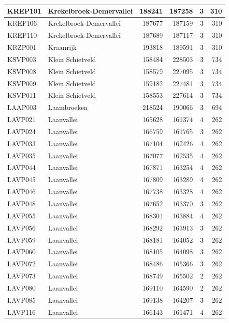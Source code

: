 \documentclass[11pt,]{book}
\begin{document}
\begin{table}
\begin{tabular}[t]{l|l|r|r|r|r}
\hline
KREP101 & Krekelbroek-Demervallei & 188241 & 187258 & 3 & 310\\
\hline
KREP106 & Krekelbroek-Demervallei & 187677 & 187159 & 3 & 310\\
\hline
KREP110 & Krekelbroek-Demervallei & 187689 & 187117 & 3 & 310\\
\hline
KRZP001 & Kraanrijk & 193818 & 189591 & 3 & 310\\
\hline
KSVP003 & Klein Schietveld & 158484 & 228503 & 3 & 734\\
\hline
KSVP008 & Klein Schietveld & 158579 & 227095 & 3 & 734\\
\hline
KSVP009 & Klein Schietveld & 159182 & 227481 & 3 & 734\\
\hline
KSVP011 & Klein Schietveld & 158553 & 227614 & 3 & 734\\
\hline
LAAP003 & Laambroeken & 218524 & 190066 & 3 & 694\\
\hline
LAVP021 & Laanvallei & 165628 & 161374 & 4 & 262\\
\hline
LAVP024 & Laanvallei & 166759 & 161765 & 3 & 262\\
\hline
LAVP033 & Laanvallei & 167104 & 162426 & 4 & 262\\
\hline
LAVP035 & Laanvallei & 167077 & 162535 & 4 & 262\\
\hline
LAVP044 & Laanvallei & 167871 & 163254 & 4 & 262\\
\hline
LAVP045 & Laanvallei & 167809 & 163289 & 4 & 262\\
\hline
LAVP046 & Laanvallei & 167738 & 163328 & 4 & 262\\
\hline
LAVP048 & Laanvallei & 167652 & 163370 & 3 & 262\\
\hline
LAVP055 & Laanvallei & 168301 & 163884 & 4 & 262\\
\hline
LAVP056 & Laanvallei & 168292 & 163913 & 3 & 262\\
\hline
LAVP059 & Laanvallei & 168181 & 164052 & 3 & 262\\
\hline
LAVP060 & Laanvallei & 168105 & 164098 & 3 & 262\\
\hline
LAVP072 & Laanvallei & 168486 & 165366 & 3 & 262\\
\hline
LAVP073 & Laanvallei & 168749 & 165502 & 2 & 262\\
\hline
LAVP080 & Laanvallei & 169110 & 164590 & 2 & 262\\
\hline
LAVP085 & Laanvallei & 169138 & 164207 & 3 & 262\\
\hline
LAVP116 & Laanvallei & 166143 & 161471 & 4 & 262\\

\end{tabular}
\end{table}
\end{document}
